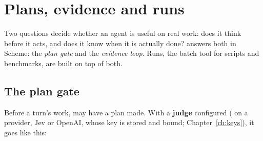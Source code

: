 \chapter{Plans, evidence and runs}
\label{ch:plans}

Two questions decide whether an agent is useful on real work: does it think
before it acts, and does it know when it is actually done? \nodwyn{}
answers both in Scheme: the \emph{plan gate} and the \emph{evidence loop}.
Runs, the batch tool for scripts and benchmarks, are built on top of both.

\section{The plan gate}

Before a turn's work,  may have a plan made. With
a \textbf{judge} configured (\code{[judge]} on a provider, Jev or OpenAI,
whose key is stored and bound; Chapter~\ref{ch:keys}), it goes
like this:

